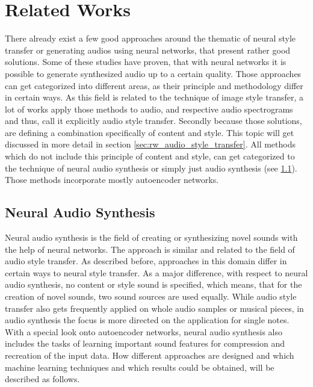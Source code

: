 \chapter{Related Works}
\label{cha:related_works}

There already exist a few good approaches around the thematic of neural style transfer or generating audios using neural networks, that present rather good solutions. Some of these studies have proven, that with neural networks it is possible to generate synthesized audio up to a certain quality. Those approaches can get categorized into different areas, as their principle and methodology differ in certain ways. As this field is related to the technique of image style transfer, a lot of works apply those methods to audio, and respective audio spectrograms and thus, call it explicitly audio style transfer. Secondly because those solutions, are defining a combination specifically of content and style. This topic will get discussed in more detail in section \ref{sec:rw_audio_style_transfer}. All methods which do not include this principle of content and style, can get categorized to the technique of neural audio synthesis or simply just audio synthesis (see \ref{sec:rw_neural_audio_synthesis}). Those methods incorporate mostly autoencoder networks. 

\section{Neural Audio Synthesis}
\label{sec:rw_neural_audio_synthesis}
Neural audio synthesis is the field of creating or synthesizing novel sounds with the help of neural networks. The approach is similar and related to the field of audio style transfer. As described before, approaches in this domain differ in certain ways to neural style transfer. As a major difference, with respect to neural audio synthesis, no content or style sound is specified, which means, that for the creation of novel sounds, two sound sources are used equally. While audio style transfer also gets frequently applied on whole audio samples or musical pieces, in audio synthesis the focus is more directed on the application for single notes. With a special look onto autoencoder networks, neural audio synthesis also includes the tasks of learning important sound features for compression and recreation of the input data. How different approaches are designed and which machine learning techniques and which results could be obtained, will be described as follows.\\

